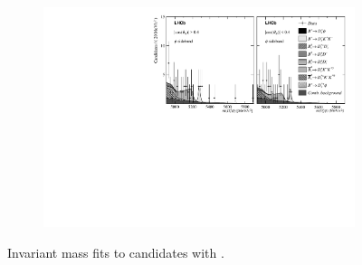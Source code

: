 \begin{figure}[!h]
\begin{subfigure}[t]{1.0\textwidth}
    \end{subfigure}
    \begin{subfigure}[t]{1.0\textwidth}
        \centering
        \includegraphics[width=1.0\textwidth]{figs/Appendix_FitCategories/canvas_DsPhiSide_Ds2PiPiPi_both_summed_splitHel_splitKKPi_s21_s21r1_s24_s26.pdf}\\
    \end{subfigure}
    \caption{Invariant mass fits to \decay{\Bp}{\Dsp\phiz} candidates with \decay{\Dsp}{\pip\pim\pip}.}
\end{figure}
